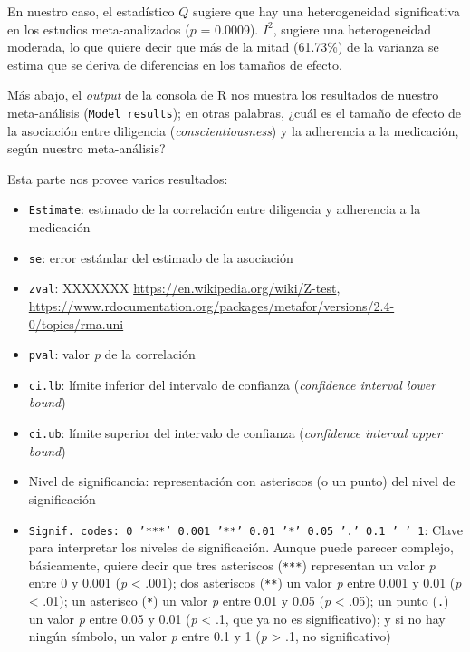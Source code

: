 \documentclass[
  bookmarksnumbered]{article}
\begin{document}
En nuestro caso, el estadístico \(Q\) sugiere que hay una heterogeneidad significativa en los estudios meta-analizados (\(p\) = 0.0009). \(I^2\), sugiere una heterogeneidad moderada, lo que quiere decir que más de la mitad (61.73\%) de la varianza se estima que se deriva de diferencias en los tamaños de efecto.

Más abajo, el \emph{output} de la consola de R nos muestra los resultados de nuestro meta-análisis (\texttt{Model\ results}); en otras palabras, ¿cuál es el tamaño de efecto de la asociación entre diligencia (\emph{conscientiousness}) y la adherencia a la medicación, según nuestro meta-análisis?

Esta parte nos provee varios resultados:

\begin{itemize}
\item
  \texttt{Estimate}: estimado de la correlación entre diligencia y adherencia a la medicación
\item
  \texttt{se}: error estándar del estimado de la asociación
\item
  \texttt{zval}: XXXXXXX \url{https://en.wikipedia.org/wiki/Z-test}, \url{https://www.rdocumentation.org/packages/metafor/versions/2.4-0/topics/rma.uni}
\item
  \texttt{pval}: valor \emph{p} de la correlación
\item
  \texttt{ci.lb}: límite inferior del intervalo de confianza (\emph{confidence interval lower bound})
\item
  \texttt{ci.ub}: límite superior del intervalo de confianza (\emph{confidence interval upper bound})
\item
  Nivel de significancia: representación con asteriscos (o un punto) del nivel de significación
\item
  \texttt{Signif.\ codes:\ 0\ ’***’\ 0.001\ ’**’\ 0.01\ ’*’\ 0.05\ ’.’\ 0.1\ ’\ ’\ 1}: Clave para interpretar los niveles de significación. Aunque puede parecer complejo, básicamente, quiere decir que tres asteriscos (\texttt{***}) representan un valor \emph{p} entre 0 y 0.001 (\emph{p} \textless{} .001); dos asteriscos (\texttt{**}) un valor \emph{p} entre 0.001 y 0.01 (\emph{p} \textless{} .01); un asterisco (\texttt{*}) un valor \emph{p} entre 0.01 y 0.05 (\emph{p} \textless{} .05); un punto (\texttt{.}) un valor \emph{p} entre 0.05 y 0.01 (\emph{p} \textless{} .1, que ya no es significativo); y si no hay ningún símbolo, un valor \emph{p} entre 0.1 y 1 (\emph{p} \textgreater{} .1, no significativo)
\end{itemize}
\end{document}
